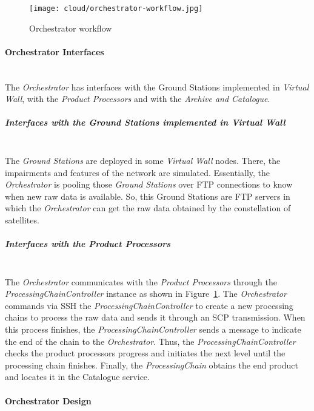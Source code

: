 \begin{figure}[!h]
\begin{center}
\texttt{[image: cloud/orchestrator-workflow.jpg]}
\caption{Orchestrator workflow}
\label{fig:orchestrator-workflow}
\end{center}
\end{figure}

\paragraph{Orchestrator Interfaces}~\\

The \emph{Orchestrator} has interfaces with the Ground Stations implemented in
\emph{Virtual Wall}, with the \emph{Product Processors} and with the
\emph{Archive and Catalogue}.
\subparagraph{Interfaces with the Ground Stations implemented in Virtual
  Wall}~\\

The \emph{Ground Stations} are deployed in some \emph{Virtual Wall} nodes. There, the impairments and features of the network are simulated. Essentially,
the \emph{Orchestrator} is pooling those \emph{Ground Stations} over \ac{FTP}
connections to know when new raw data is available. So, this Ground Stations are
\ac{FTP} servers in which the \emph{Orchestrator} can get the raw data obtained
by the constellation of satellites.

\subparagraph{Interfaces with the Product Processors}~\\

The \emph{Orchestrator} communicates with the \emph{Product Processors} through
the \emph{ProcessingChainController} instance as shown in
Figure~\ref{fig:orchestrator-workflow}. The \emph{Orchestrator} commands via
\ac{SSH} the \emph{ProcessingChainController} to create a new processing chains
to process the raw data and sends it through an \ac{SCP} transmission. When this
process finishes, the \emph{ProcessingChainController} sends  a message to
indicate the end of the chain to the \emph{Orchestrator}. Thus, the \emph{ProcessingChainController} checks the product processors progress and initiates the next level until the processing chain finishes. Finally, the \emph{ProcessingChain} obtains the end product and locates it in the Catalogue service. 

\paragraph{Orchestrator Design}~\\

